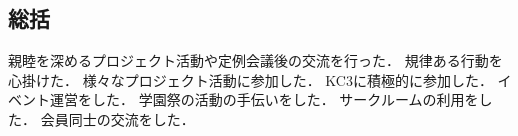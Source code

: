 \subsection*{\firstGrade{}総括}

親睦を深めるプロジェクト活動や定例会議後の交流を行った．
規律ある行動を心掛けた．
様々なプロジェクト活動に参加した．
KC3に積極的に参加した．
イベント運営をした．
学園祭の活動の手伝いをした．
サークルームの利用をした．
会員同士の交流をした．
